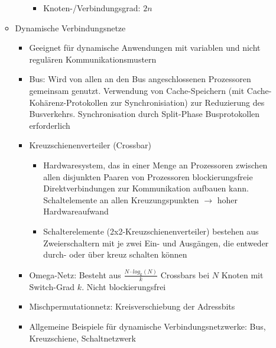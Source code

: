 \begin{itemize}
\begin{itemize}
\begin{itemize}
\begin{itemize}
				\item Knoten-/Verbindungsgrad: \(2n\)
			\end{itemize}
		\end{itemize}
		\item Dynamische Verbindungsnetze
		\begin{itemize}
			\item Geeignet für dynamische Anwendungen mit variablen und nicht regulären Kommunikationsmustern
			\item Bus: Wird von allen an den Bus angeschlossenen Prozessoren gemeinsam genutzt. Verwendung von Cache-Speichern (mit Cache-Kohärenz-Protokollen zur Synchronisiation) zur Reduzierung des Busverkehrs. Synchronisation durch Split-Phase Busprotokollen erforderlich
			\item Kreuzschienenverteiler (Crossbar)
			\begin{itemize}
				\item Hardwaresystem, das in einer Menge an Prozessoren zwischen allen disjunkten Paaren von Prozessoren blockierungsfreie Direktverbindungen zur Kommunikation aufbauen kann. Schaltelemente an allen Kreuzungspunkten \(\rightarrow\) hoher Hardwareaufwand
				\item Schalterelemente (2x2-Kreuzschienenverteiler) bestehen aus Zweierschaltern mit je zwei Ein- und Ausgängen, die entweder durch- oder über kreuz schalten können
			\end{itemize}
			\item Omega-Netz: Besteht aus \(\frac{N\cdot log_k(N)}{k}\) Crossbars bei \(N\) Knoten mit Switch-Grad \(k\). Nicht blockierungsfrei
			\item Mischpermutationnetz: Kreisverschiebung der Adressbits
			\item Allgemeine Beispiele für dynamische Verbindungsnetzwerke: Bus, Kreuzschiene, Schaltnetzwerk
		\end{itemize}
	\end{itemize}
\end{itemize}


